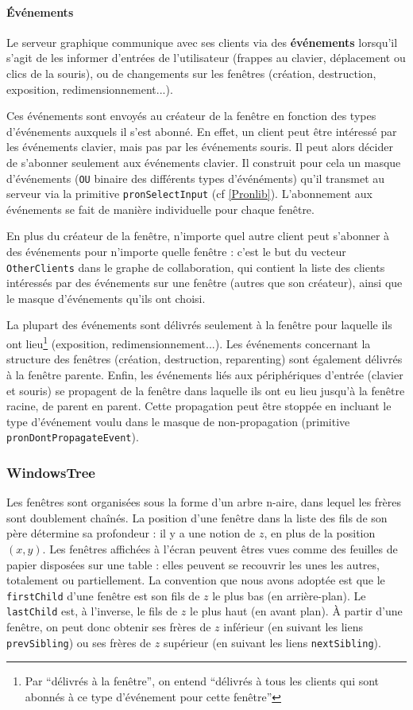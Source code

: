 \paragraph{Événements}\label{evenements}
Le serveur graphique communique avec ses clients via des \textbf{événements} lorsqu'il s'agit de les informer d'entrées de l'utilisateur (frappes au clavier, déplacement ou clics de la souris), ou de changements sur les fenêtres (création, destruction, exposition, redimensionnement...).

Ces événements sont envoyés au créateur de la fenêtre en fonction des types d'événements auxquels il s'est abonné. En effet, un client peut être intéressé par les événements clavier, mais pas par les événements souris. Il peut alors décider de s'abonner seulement aux événements clavier. Il construit pour cela un masque d'événements (\verb|OU| binaire des différents types d'événéments) qu'il transmet au serveur via la primitive \verb|pronSelectInput| (cf \ref{Pronlib}). L'abonnement aux événements se fait de manière individuelle pour chaque fenêtre.

En plus du créateur de la fenêtre, n'importe quel autre client peut s'abonner à des événements pour n'importe quelle fenêtre : c'est le but du vecteur \verb|OtherClients| dans le graphe de collaboration, qui contient la liste des clients intéressés par des événements sur une fenêtre (autres que son créateur), ainsi que le masque d'événements qu'ils ont choisi.

La plupart des événements sont délivrés seulement à la fenêtre pour laquelle ils ont lieu\footnote{Par ``délivrés à la fenêtre'', on entend ``délivrés à tous les clients qui sont abonnés à ce type d'événement pour cette fenêtre''} (exposition, redimensionnement...). Les événements concernant la structure des fenêtres (création, destruction, reparenting) sont également délivrés à la fenêtre parente. Enfin, les événements liés aux périphériques d'entrée (clavier et souris) se propagent de la fenêtre dans laquelle ils ont eu lieu jusqu'à la fenêtre racine, de parent en parent. Cette propagation peut être stoppée en incluant le type d'événement voulu dans le masque de non-propagation (primitive \verb|pronDontPropagateEvent|).

\subsubsection{WindowsTree}
Les fenêtres sont organisées sous la forme d'un arbre n-aire, dans lequel les frères sont doublement chaînés. La position d'une fenêtre dans la liste des fils de son père détermine sa profondeur : il y a une notion de $z$, en plus de la position $(x, y)$. Les fenêtres affichées à l'écran peuvent êtres vues comme des feuilles de papier disposées sur une table : elles peuvent se recouvrir les unes les autres, totalement ou partiellement. La convention que nous avons adoptée est que le \verb|firstChild| d'une fenêtre est son fils de $z$ le plus bas (en arrière-plan). Le \verb|lastChild| est, à l'inverse, le fils de $z$ le plus haut (en avant plan). À partir d'une fenêtre, on peut donc obtenir ses frères de $z$ inférieur (en suivant les liens \verb|prevSibling|) ou ses frères de $z$ supérieur (en suivant les liens \verb|nextSibling|).

